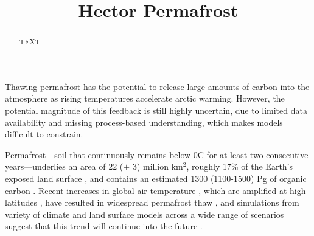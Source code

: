 \documentclass[essd, manuscript]{copernicus}
\begin{document}
\title{Hector Permafrost}








\received{}
\pubdiscuss{} %
\revised{}
\accepted{}
\published{}




\maketitle



\begin{abstract}
TEXT
\end{abstract}




\introduction
 Thawing permafrost has the potential to release large amounts of carbon into the atmosphere as rising temperatures accelerate arctic warming. However, the potential magnitude of this feedback is still highly uncertain, due to limited data availability and missing process-based understanding, which makes models difficult to constrain.  

Permafrost---soil that continuously remains below 0\degree C for at least two consecutive years---underlies an area of 22 ($\pm$ 3) million km$^2$, roughly 17\% of the Earth's exposed land surface \citep{gruber_2012_derivation}, and contains an estimated 1300 (1100-1500) Pg of organic carbon \citep{hugelius_2014_estimated}. %
Recent increases in global air temperature \citep{stocker_2013_climate}, which are amplified at high latitudes \citep{pithan_2014_arctic}, have resulted in widespread permafrost thaw \citep{romanovsky_2010_permafrost}, and simulations from variety of climate and land surface models across a wide range of scenarios suggest that this trend will continue into the future \citep{koven_2013_analysis, chadburn_2017_observation}.
\end{document}
